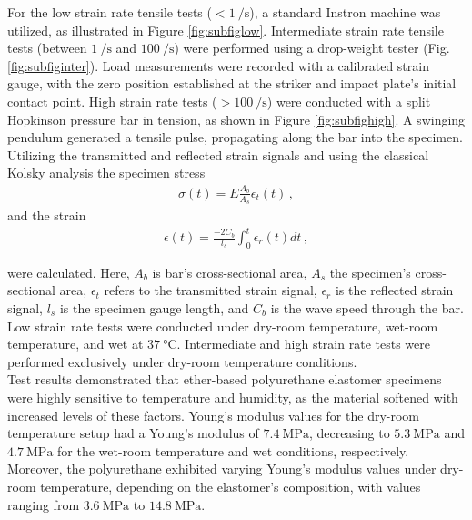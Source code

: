 For the low strain rate tensile tests ($< \SI[per-mode = symbol]{1}{\per \second}$), a standard Instron machine was utilized, as illustrated in Figure 
\ref{fig:subfiglow}. Intermediate strain rate tensile tests (between $\SI[per-mode = symbol]{1}{\per \second}$ and $\SI[per-mode = symbol]{100}{\per \second}$) 
were performed using a drop-weight tester (Fig. \ref{fig:subfiginter}). Load measurements were recorded with a calibrated strain gauge, 
with the zero position established at the striker and impact plate's initial contact point.
High strain rate tests ($>\SI[per-mode = symbol]{100}{\per \second}$) were conducted with a split Hopkinson pressure bar in tension, as shown in Figure \ref{fig:subfighigh}.
A swinging pendulum generated a tensile pulse, propagating along the bar into the specimen. Utilizing 
the transmitted and reflected strain signals and using the classical Kolsky analysis the specimen stress
\begin{align}
        \sigma(t) = E\frac{A_b}{A_s}\epsilon_t(t) \, ,
\end{align}
and the strain
\begin{align}
        \epsilon(t) = \frac{-2C_b}{l_s} \int_{0}^{t} \epsilon_r(t) dt \, ,
\end{align}

were calculated. Here, $A_b$ is bar's cross-sectional area, $A_s$ the specimen's cross-sectional area,
$\epsilon_t$ refers to the transmitted strain signal, $\epsilon_r$ is the reflected strain signal,
$l_s$ is the specimen gauge length, and $C_b$ is the wave speed through the bar.
Low strain rate tests were conducted under dry-room temperature, wet-room temperature, and wet at $\SI{37}{\degreeCelsius}$. 
Intermediate and high strain rate tests were performed exclusively under dry-room temperature conditions.\\

Test results demonstrated that ether-based polyurethane elastomer specimens were highly sensitive to 
temperature and humidity, as the material softened with increased levels of these factors. Young's 
modulus values for the dry-room temperature setup had a Young's modulus of $\SI{7.4}{\mega \pascal}$, decreasing to $\SI{5.3}{\mega \pascal}$ 
and $\SI{4.7}{\mega \pascal}$ for the wet-room temperature and wet conditions, respectively.
Moreover, the polyurethane exhibited varying Young's modulus values under dry-room temperature, depending 
on the elastomer's composition, with values ranging from $\SI{3.6}{\mega \pascal}$ to $\SI{14.8}{\mega \pascal}$.

